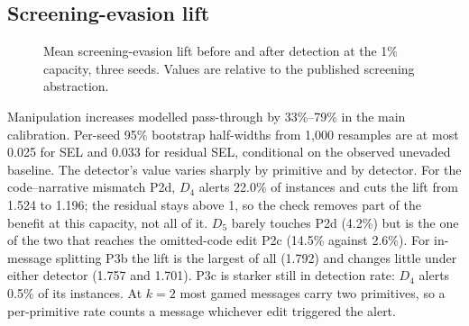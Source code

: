 \documentclass[conference]{IEEEtran}
\begin{document}
\subsection{Screening-evasion lift}
\begin{figure}[!t]
\centering
{}
\caption{Mean screening-evasion lift before and after detection at the 1\%
capacity, three seeds. Values are relative to the published screening
abstraction.}
\label{fig:sel}
\end{figure}
Manipulation increases modelled pass-through by
33\%--79\% in the main calibration. Per-seed
95\% bootstrap half-widths from 1,000 resamples are at most 0.025
for SEL and 0.033 for residual SEL, conditional on the observed
unevaded baseline. The detector's value varies sharply by primitive and by
detector. For the code--narrative mismatch P2d, $D_4$ alerts
22.0\% of instances and cuts the lift from 1.524 to
1.196; the residual stays above 1, so the check removes part of the
benefit at this capacity, not all of it. $D_5$ barely touches P2d
(4.2\%) but is the one of the two that reaches the omitted-code
edit P2c (14.5\% against 2.6\%). For in-message
splitting P3b the lift is the largest of all (1.792) and changes little
under either detector (1.757 and 1.701). P3c is starker still
in detection rate: $D_4$ alerts 0.5\% of its instances. At
$k=2$ most gamed messages carry two primitives, so a per-primitive rate
counts a message whichever edit triggered the alert.
\end{document}
